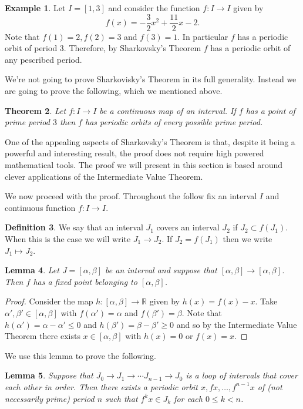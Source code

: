 \documentclass[12pt]{article}
\newtheorem{theorem}{Theorem}[section]
\newtheorem{lemma}[theorem]{Lemma}
\theoremstyle{definition}
\newtheorem{definition}[theorem]{Definition}
\newtheorem{example}[theorem]{Example}
\theoremstyle{remark}
\begin{document}
\begin{example}
Let $I = [1,3]$ and consider the function $f : I \to I$ given by
\[
f(x) = -\frac{3}{2} x^2 + \frac{11}{2} x - 2.
\]
Note that $f(1) = 2, f(2) =3$ and $f(3) =1$. In particular $f$ has a periodic orbit of period $3$. Therefore, by Sharkovsky's Theorem $f$ has a periodic orbit of any pescribed period.
\end{example}

We're not going to prove Sharkovisky's Theorem in its full generality. Instead we are going to prove the following, which we mentioned above.
\begin{theorem}\label{thm.shark3}
Let $f: I \to I$ be a continuous map of an interval. If $f$ has a point of prime period $3$ then $f$ has periodic orbits of every possible prime period. 
\end{theorem}
One of the appealing aspects of Sharkovsky's Theorem is that, despite it being a powerful and interesting result, the proof  does not require high powered mathematical tools. The proof we will present in this section is based around clever applications of the Intermediate Value Theorem.

We now proceed with the proof. Throughout the follow fix an interval $I$ and continuous function $f: I \to I$.

\begin{definition}
We say that an interval $J_1$ covers an interval $J_2$ if $J_2 \subset f(J_1)$. When this is the case we will write $J_1 \rightarrow J_2$. If $J_2 = f(J_1)$ then we write $J_1 \mapsto J_2$.
\end{definition}

\begin{lemma}\label{lem.fp}
Let $J=[\alpha,\beta]$ be an interval and suppose that $[\alpha,\beta] \to [\alpha,\beta]$. Then $f$ has a fixed point belonging to $[\alpha,\beta]$.
\end{lemma}
\begin{proof}
Consider the map $h: [\alpha,\beta] \to \mathbb{R}$ given by $h(x) = f(x) - x$. 
Take $\alpha', \beta' \in [\alpha,\beta]$ with $f(\alpha') = \alpha$ and $f(\beta')=\beta$. Note that 
$h(\alpha') =\alpha-\alpha' \le 0$ and $h(\beta') = \beta - \beta' \ge 0$ and so by the Intermediate Value Theorem there exists $x \in [\alpha,\beta]$ with $h(x) = 0$ or $f(x) = x$.
\end{proof}

We use this lemma to prove the following.

\begin{lemma}\label{lem.itin}
Suppose that $J_0 \to J_1 \to \cdots J_{n-1} \to J_0$ is a loop of intervals that cover each other in order. Then there exists a periodic orbit $x, fx, \ldots, f^{n-1}x$ of (not necessarily prime) period $n$ such that $f^kx \in J_k$ for each $0 \le k < n$.
\end{lemma}
\end{document}
